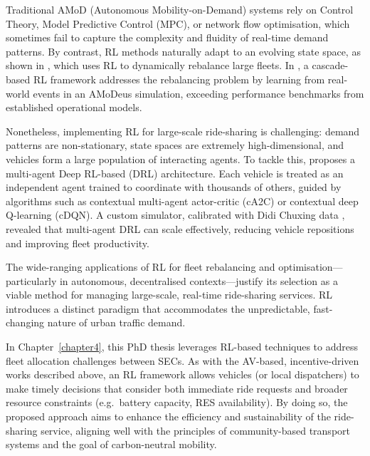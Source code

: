 Traditional AMoD (Autonomous Mobility-on-Demand) systems rely on Control Theory, Model Predictive Control (MPC), or network flow optimisation, which sometimes fail to capture the complexity and fluidity of real-time demand patterns. By contrast, RL methods naturally adapt to an evolving state space, as shown in \cite{singhal2024realtime}, which uses RL to dynamically rebalance large fleets. In \cite{Reference3}, a cascade-based RL framework addresses the rebalancing problem by learning from real-world events in an AMoDeus simulation, exceeding performance benchmarks from established operational models.

Nonetheless, implementing RL for large-scale ride-sharing is challenging: demand patterns are non-stationary, state spaces are extremely high-dimensional, and vehicles form a large population of interacting agents. To tackle this, \cite{Reference2} proposes a multi-agent Deep RL-based (DRL) architecture. Each vehicle is treated as an independent agent trained to coordinate with thousands of others, guided by algorithms such as contextual multi-agent actor-critic (cA2C) or contextual deep Q-learning (cDQN). A custom simulator, calibrated with Didi Chuxing data \cite{didi2024global}, revealed that multi-agent DRL can scale effectively, reducing vehicle repositions and improving fleet productivity.

The wide-ranging applications of RL for fleet rebalancing and optimisation—particularly in autonomous, decentralised contexts—justify its selection as a viable method for managing large-scale, real-time ride-sharing services. RL introduces a distinct paradigm that accommodates the unpredictable, fast-changing nature of urban traffic demand. 

In Chapter~\ref{chapter4}, this PhD thesis leverages RL-based techniques to address fleet allocation challenges between SECs. As with the AV-based, incentive-driven works described above, an RL framework allows vehicles (or local dispatchers) to make timely decisions that consider both immediate ride requests and broader resource constraints (e.g.\ battery capacity, RES availability). By doing so, the proposed approach aims to enhance the efficiency and sustainability of the ride-sharing service, aligning well with the principles of community-based transport systems and the goal of carbon-neutral mobility.


